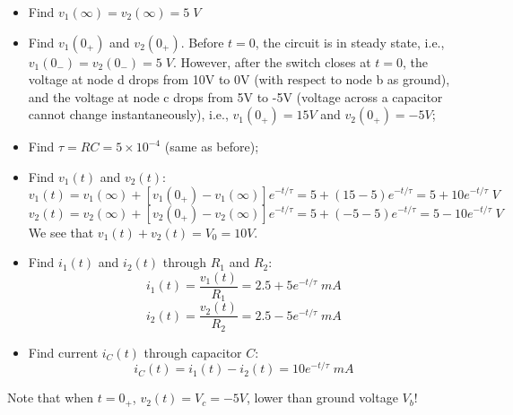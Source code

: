\documentclass{article}
\begin{document}
\begin{itemize}
\item Find $v_1(\infty)=v_2(\infty)=5\;V$
\item Find $v_1(0_+)$ and $v_2(0_+)$. Before $t=0$, the circuit is in
	steady state, i.e., $v_1(0_-)=v_2(0_-)=5\;V$. However, after
	the switch closes at $t=0$, the voltage at node d drops from 
	10V to 0V (with respect to node b as ground), and the voltage 
        at node c drops from 5V to -5V (voltage across a capacitor 
        cannot change instantaneously), i.e., $v_1(0_+)=15V$ and 
        $v_2(0_+)=-5V$; 
\item Find $\tau=RC=5\times 10^{-4}$ (same as before);
\item Find $v_1(t)$ and $v_2(t)$:
  \begin{equation}	
    v_1(t)=v_1(\infty)+[v_1(0_+)-v_1(\infty)]e^{-t/\tau}
    =5+(15-5)e^{-t/\tau}=5+10e^{-t/\tau}\;V	
  \end{equation}
  \begin{equation}
    v_2(t)=v_2(\infty)+[v_2(0_+)-v_2(\infty)]e^{-t/\tau}
    =5+(-5-5)e^{-t/\tau}=5-10e^{-t/\tau}\;V	
  \end{equation}
  We see that $v_1(t)+v_2(t)=V_0=10V$.
\item Find $i_1(t)$ and $i_2(t)$ through $R_1$ and $R_2$:
  \begin{equation}
    i_1(t)=\frac{v_1(t)}{R_1}=2.5+5e^{-t/\tau}\;mA	
  \end{equation}
  \begin{equation}
    i_2(t)=\frac{v_2(t)}{R_2}=2.5-5e^{-t/\tau}\;mA	
  \end{equation}
\item Find current $i_C(t)$ through capacitor $C$:
  \begin{equation} 
    i_C(t)=i_1(t)-i_2(t)=10 e^{-t/\tau}\; mA  
  \end{equation}
\end{itemize}
Note that when $t=0_+$, $v_2(t)=V_c=-5V$, lower than ground voltage $V_b$!

\end{document}
